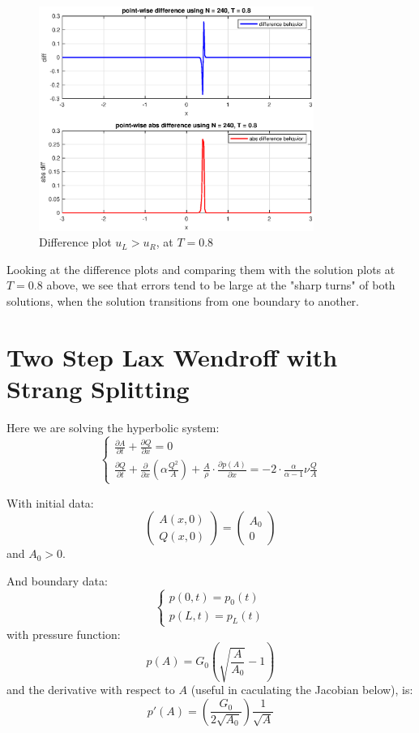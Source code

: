\documentclass[12pt]{article} %
\newcommand{\pdx}[2]{\frac{\partial {#2}}{\partial {#1}}}
\begin{document}
\begin{figure}[h!]
\caption{Difference plot $u_L > u_R$, at $T = 0.8$}
\centering
\includegraphics[width=0.8\textwidth]{diff2.eps}
\end{figure}

Looking at the difference plots and comparing them with the solution plots at $T = 0.8$ above, we see that errors tend to be large at the "sharp turns" of both solutions, when the solution transitions from one boundary to another.
\
\newpage
\
\section{Two Step Lax Wendroff with Strang Splitting}
Here we are solving the hyperbolic system:
$$
\begin{cases}
	\pdx{t}{A} + \pdx{x}{Q} = 0 \\
	\pdx{t}{Q} + \frac{\partial}{\partial x}(\alpha \frac{Q^2}{A}) + \frac{A}{\rho} \cdot \frac{\partial p(A)}{\partial x} = -2\cdot \frac{\alpha}{\alpha -1}\nu \frac{Q}{A}
\end{cases}
$$

With initial data:
$$
	\begin{pmatrix}
		A(x,0) \\
		Q(x,0)
	\end{pmatrix} = 
	\begin{pmatrix}
		A_0 \\
		0
	\end{pmatrix}
$$ and $A_0 > 0$.

And boundary data:
$$
	\begin{cases}
		p(0,t) = p_0(t)\\
		p(L,t) = p_L(t)
	\end{cases}
$$ with pressure function:
$$
	p(A) = G_0 (\sqrt{\frac{A}{A_0}}-1)
$$ and the derivative with respect to $A$ (useful in caculating the Jacobian below), is:
$$
	p'(A) = (\frac{G_0}{2\sqrt{A_0}})\frac{1}{\sqrt{A}}
$$	
\end{document}
